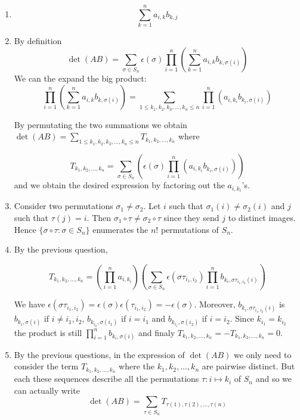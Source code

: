 \begin{enumerate}
\item $$\sum_{k=1}^n a_{i,k} b_{k,j}$$
\item By definition
  $$
  \det(AB) = \sum_{\sigma \in S_n}
  {\epsilon{(\sigma)}}
  \prod_{i=1}^n
  \left(\sum_{k=1}^n a_{i,k} b_{k,\sigma(i)} \right)$$
  We can the expand the big product:
  $$\prod_{i=1}^n
  \left(\sum_{k=1}^n a_{i,k} b_{k,\sigma(i)} \right) =
       {\sum_{1\leq k_1,k_2,k_3,\dots,k_n\leq n}
         \prod_{i=1}^n \left(a_{i,k_i} b_{k_i,\sigma(i)}\right)
         }$$

  By permutating the two summations we obtain $\det(AB) =
  \sum_{1\leq k_1,k_2,k_3,\dots,k_n\leq n} T_{k_1,k_2,\dots,k_n}$ where

  $$T_{k_1,k_2,\dots,k_n} =
  \sum_{\sigma \in S_n} \left(
  \epsilon{(\sigma)}
  \prod_{i=1}^n \left(a_{i,k_i} b_{k_i,\sigma(i)}\right)
  \right)
  $$
  and we obtain the desired expression by factoring out the $a_{i,k_i}$'s.

\item
  Consider two permutations $\sigma_1 \neq \sigma_2$.
  Let $i$ such that $\sigma_1(i) \neq \sigma_2(i)$ and
  $j$ such that $\tau(j) = i$.
  Then ${\sigma_1 \circ \tau} \neq {\sigma_2 \circ \tau}$ since they send
  $j$ to distinct images. Hence
  $\{ \sigma \circ \tau : \sigma \in S_n \}$ enumerates the $n!$ permutations
  of $S_n$.
\item By the previous question,

  $$T_{k_1,k_2,\dots,k_n} =
  \left(\prod_{i=1}^n a_{i,k_i}\right)\left(
  \sum_{\sigma \in S_n} \epsilon{({\sigma \tau_{i_1,i_2}})}
  {\prod_{i=1}^n b_{k_i,{\sigma \tau_{i_1,i_2}}(i)}}\right)
  $$

  We have $\epsilon{({\sigma \tau_{i_1,i_2}})} =
  \epsilon{({\sigma})}  \epsilon{(\tau_{i_1,i_2})} =
  -\epsilon{({\sigma})}$.
  Moreover, $b_{k_i,{\sigma \tau_{i_1,i_2}}(i)}$ is
    $b_{k_i,\sigma(i)}$ if $i \neq i_1,i_2$,
    $b_{k_{i_2},\sigma(i_1)}$ if $i = i_1$ and
  $b_{k_{i_1},\sigma(i_2)}$ if $i = i_2$.
  Since $k_{i_1} = k_{i_2}$ the product is still
  $\prod_{i=1}^n b_{k_i,{\sigma}(i)}$ and finaly
  $T_{k_1,k_2,\dots,k_n} = -T_{k_1,k_2,\dots,k_n} = 0$.

\item
  By the previous questions, in the expression of $\det{(AB)}$
  we only need to consider the term $T_{k_1,k_2,\dots,k_n}$
  where the $k_1, k_2, \dots, k_n$ are pairwise distinct. But each these
  sequences describe all the permutations $\tau: i \mapsto k_i$ of
  $S_n$ and so we can actually write
  $$\det(AB) = \sum_{\tau \in S_n} T_{\tau(1), \tau(2), \dots, \tau(n)}$$


\end{enumerate}
